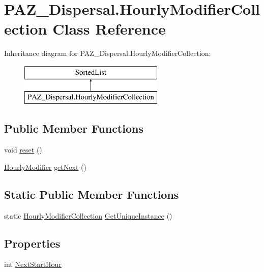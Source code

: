 \hypertarget{class_p_a_z___dispersal_1_1_hourly_modifier_collection}{\section{P\-A\-Z\-\_\-\-Dispersal.\-Hourly\-Modifier\-Collection Class Reference}
\label{class_p_a_z___dispersal_1_1_hourly_modifier_collection}
}
Inheritance diagram for P\-A\-Z\-\_\-\-Dispersal.\-Hourly\-Modifier\-Collection\-:\begin{figure}[H]
\begin{center}
\leavevmode
\includegraphics[height=2.000000cm]{class_p_a_z___dispersal_1_1_hourly_modifier_collection}
\end{center}
\end{figure}
\subsection*{Public Member Functions}
\begin{DoxyCompactItemize}
\item 
void \hyperlink{class_p_a_z___dispersal_1_1_hourly_modifier_collection_acbd6dc0b3e40414b33773b1b44bedf1d}{reset} ()
\item 
\hyperlink{class_p_a_z___dispersal_1_1_hourly_modifier}{Hourly\-Modifier} \hyperlink{class_p_a_z___dispersal_1_1_hourly_modifier_collection_a784aeff69ececadd4b6a2ec953e3df93}{get\-Next} ()
\end{DoxyCompactItemize}
\subsection*{Static Public Member Functions}
\begin{DoxyCompactItemize}
\item 
static \hyperlink{class_p_a_z___dispersal_1_1_hourly_modifier_collection}{Hourly\-Modifier\-Collection} \hyperlink{class_p_a_z___dispersal_1_1_hourly_modifier_collection_a9697e8bcc608f5439daa532f9f0035a0}{Get\-Unique\-Instance} ()
\end{DoxyCompactItemize}
\subsection*{Properties}
\begin{DoxyCompactItemize}
\item 
int \hyperlink{class_p_a_z___dispersal_1_1_hourly_modifier_collection_a2663ad96f4a37593fc2b794f22eed8f5}{Next\-Start\-Hour}
\end{DoxyCompactItemize}


